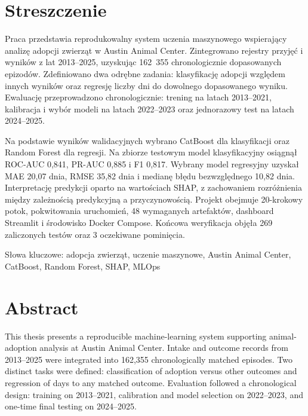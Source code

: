 \chapter*{Streszczenie}

Praca przedstawia reprodukowalny system uczenia maszynowego wspierający analizę adopcji zwierząt w Austin Animal Center. Zintegrowano rejestry przyjęć i wyników z lat 2013--2025, uzyskując 162~355 chronologicznie dopasowanych epizodów. Zdefiniowano dwa odrębne zadania: klasyfikację adopcji względem innych wyników oraz regresję liczby dni do dowolnego dopasowanego wyniku. Ewaluację przeprowadzono chronologicznie: trening na latach 2013--2021, kalibracja i wybór modeli na latach 2022--2023 oraz jednorazowy test na latach 2024--2025.

Na podstawie wyników walidacyjnych wybrano CatBoost dla klasyfikacji oraz Random Forest dla regresji. Na zbiorze testowym model klasyfikacyjny osiągnął ROC-AUC 0,841, PR-AUC 0,885 i F1 0,817. Wybrany model regresyjny uzyskał MAE 20,07 dnia, RMSE 35,82 dnia i medianę błędu bezwzględnego 10,82 dnia. Interpretację predykcji oparto na wartościach SHAP, z zachowaniem rozróżnienia między zależnością predykcyjną a przyczynowością. Projekt obejmuje 20-krokowy potok, pokwitowania uruchomień, 48 wymaganych artefaktów, dashboard Streamlit i środowisko Docker Compose. Końcowa weryfikacja objęła 269 zaliczonych testów oraz 3 oczekiwane pominięcia.

\vspace{20pt}
\noindent Słowa kluczowe: adopcja zwierząt, uczenie maszynowe, Austin Animal Center, CatBoost, Random Forest, SHAP, MLOps

\vspace{50pt}

\begingroup
\let\clearpage\relax
\chapter*{Abstract}
\endgroup

This thesis presents a reproducible machine-learning system supporting animal-adoption analysis at Austin Animal Center. Intake and outcome records from 2013--2025 were integrated into 162,355 chronologically matched episodes. Two distinct tasks were defined: classification of adoption versus other outcomes and regression of days to any matched outcome. Evaluation followed a chronological design: training on 2013--2021, calibration and model selection on 2022--2023, and one-time final testing on 2024--2025.

